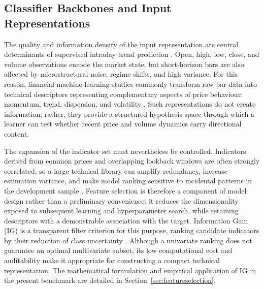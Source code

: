 \FloatBarrier

\subsection{Classifier Backbones and Input Representations}\label{subsec:backbones_features}

The quality and information density of the input representation are central determinants of supervised intraday trend prediction \cite{singh2022feature}. Open, high, low, close, and volume observations encode the market state, but short-horizon bars are also affected by microstructural noise, regime shifts, and high variance. For this reason, financial machine-learning studies commonly transform raw bar data into technical descriptors representing complementary aspects of price behaviour: momentum, trend, dispersion, and volatility \cite{billah2024nca_moving_average, hunter1986exponentially, bollinger1992using}. Such representations do not create information; rather, they provide a structured hypothesis space through which a learner can test whether recent price and volume dynamics carry directional content.

The expansion of the indicator set must nevertheless be controlled. Indicators derived from common prices and overlapping lookback windows are often strongly correlated, so a large technical library can amplify redundancy, increase estimation variance, and make model ranking sensitive to incidental patterns in the development sample \cite{lei2012feature, kumar2014feature}. Feature selection is therefore a component of model design rather than a preliminary convenience: it reduces the dimensionality exposed to subsequent learning and hyperparameter search, while retaining descriptors with a demonstrable association with the target. Information Gain (IG) is a transparent filter criterion for this purpose, ranking candidate indicators by their reduction of class uncertainty \cite{lei2012feature, anonymous2025precursor}. Although a univariate ranking does not guarantee an optimal multivariate subset, its low computational cost and auditability make it appropriate for constructing a compact technical representation. The mathematical formulation and empirical application of IG in the present benchmark are detailed in Section~\ref{sec:featureselection}.

